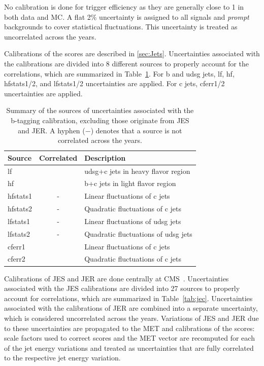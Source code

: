 No calibration is done for trigger efficiency as they are generally close to 1 in both data and \ac{MC}. A flat 2$\%$ uncertainty is assigned to all signals and \emph{prompt} backgrounds to cover statistical fluctuations. This uncertainty is treated as uncorrelated across the years.

Calibrations of the \DeepJ scores are described in \autoref{sec:Jets}. Uncertainties associated with the calibrations are divided into 8 different sources to properly account for the correlations, which are summarized in Table~\ref{tab:btagsys}. For b and udsg jets, lf, hf, hfstats1/2, and lfstats1/2 uncertainties are applied. For c jets, cferr1/2 uncertainties are applied. 

\begin{table}[!hbtp]
\sffamily
\centering
\caption{
Summary of the sources of uncertainties associated with the b-tagging calibration, excluding those originate from \ac{JES} and \ac{JER}. A hyphen ($-$) denotes that a source is not correlated across the years.
}
\begin{tabular}{lcl}
\toprule
Source & Correlated & Description\\
\midrule
lf			& \checkmark & udsg+c jets in heavy flavor region\\ %
hf			& \checkmark & b+c jets in light flavor region \\ %
hfstats1	& - 		 & Linear fluctuations of c jets\\
hfstats2	& -			 & Quadratic fluctuations of c jets \\
lfstats1	& -			 & Linear fluctuations of udsg jets \\
lfstats2	& -			 & Quadratic fluctuations of udsg jets \\
cferr1		& \checkmark & Linear fluctuations of c jets \\
cferr2		& \checkmark & Quadratic fluctuations of c jets \\
\bottomrule
\end{tabular}
\label{tab:btagsys}
\end{table}

Calibrations of \ac{JES} and \ac{JER} are done centrally at \ac{CMS}~\cite{CMS:2016lmd}. Uncertainties associated with the \ac{JES} calibrations are divided into 27 sources to properly account for correlations, which are summarized in Table~\ref{tab:jec}. Uncertainties associated with the calibrations of \ac{JER} are combined into a separate uncertainty, which is considered uncorrelated across the years. Variations of \ac{JES} and \ac{JER} due to these uncertainties are propagated to the \ac{MET} and calibrations of the \DeepJ scores: scale factors used to correct \DeepJ scores and the \ac{MET} vector are recomputed for each of the jet energy variations and treated as uncertainties that are fully correlated to the respective jet energy variation. 

